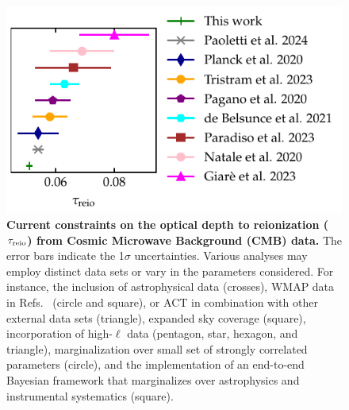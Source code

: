 \begin{figure}[tb]
\centering
\includegraphics{figs/tau_fig.pdf}
\caption{\textbf{Current constraints on the optical depth to
reionization ($\tau_{\mathrm{reio}}$) from Cosmic Microwave Background (CMB)
data.}
The error bars indicate the 1$\sigma$ uncertainties.
Various analyses may employ distinct data sets or vary in the parameters
considered.
For instance, the inclusion of astrophysical data \cite{Paoletti2024} (crosses), WMAP data in Refs.~ \cite{Natale2020,
Paradiso2023} (circle and square), or ACT in combination with other
external data sets \cite{Giare2023} (triangle), expanded sky coverage
\cite{Paradiso2023} (square), incorporation of high-$\ell$ data
\cite{Pagano2020, Planck2020a, deBelsunce2021, Giare2023} (pentagon, star, hexagon, and
triangle), marginalization over small set of strongly correlated
parameters \cite{Natale2020} (circle), and the implementation of an
end-to-end Bayesian framework that marginalizes over astrophysics and
instrumental systematics \cite{Paradiso2023} (square).}
\label{fig:tau}
\end{figure}


